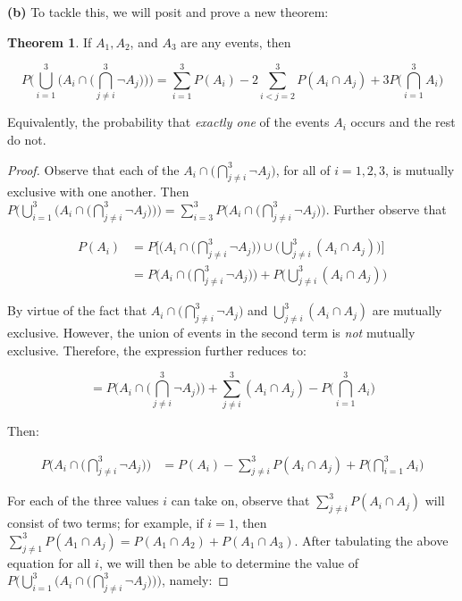 \documentclass[10pt, oneside]{article}   	%
\theoremstyle{definition}
\newtheorem*{thm}{Theorem}
\begin{document}
\begin{enumerate}[label=3.\arabic*]
\textbf{(b)} To tackle this, we will posit and prove a new theorem:

\begin{thm}If $A_1, A_2$, and $A_3$ are any events, then

\[ P \Bigg( \bigcup^3_{i=1} \bigg( A_i  \cap \Big( \bigcap^3_{j \neq i} \neg A_j \Big) \bigg) \Bigg) = \sum^3_{i = 1} P(A_i) - 2 \sum^3_{i < j = 2} P(A_i \cap A_j) + 3 P\Bigg( \bigcap^3_{i=1} A_i \Bigg) \]

Equivalently, the probability that \textit{exactly one} of the events $A_i$ occurs and the rest do not.
\end{thm}

\begin{proof}Observe that each of the $A_i  \cap \Big( \bigcap^3_{j \neq i} \neg A_j \Big)$, for all of $i = 1, 2, 3$, is mutually exclusive with one another. Then $P \Bigg( \bigcup^3_{i=1} \bigg( A_i  \cap \Big( \bigcap^3_{j \neq i} \neg A_j \Big) \bigg) \Bigg) = \sum^3_{i = 3} P \Bigg( A_i  \cap \Big( \bigcap^3_{j \neq i} \neg A_j \Big) \Bigg)$. Further observe that

\begin{align*}
P(A_i) &= P\Bigg[ \Bigg( A_i  \cap \Big( \bigcap^3_{j \neq i} \neg A_j \Big) \Bigg) \cup \Bigg( \bigcup^3_{j \neq i} (A_i \cap A_j) \Bigg) \Bigg] \\
&= P\Bigg( A_i  \cap \Big( \bigcap^3_{j \neq i} \neg A_j \Big) \Bigg) + P \Bigg( \bigcup^3_{j \neq i} (A_i \cap A_j) \Bigg) 
\end{align*}

By virtue of the fact that $A_i  \cap \Big( \bigcap^3_{j \neq i} \neg A_j \Big)$ and $\bigcup^3_{j \neq i} (A_i \cap A_j)$ are mutually exclusive. However, the union of events in the second term is \textit{not} mutually exclusive. Therefore, the expression further reduces to:

\[ = P\Bigg( A_i  \cap \Big( \bigcap^3_{j \neq i} \neg A_j \Big) \Bigg) + \sum^3_{j \neq i} (A_i \cap A_j) - P\Bigg( \bigcap^3_{i = 1} A_i \Bigg) \]

Then:

\begin{align*}
P \Bigg( A_i  \cap \Big( \bigcap^3_{j \neq i} \neg A_j \Big) \Bigg) &= P(A_i) - \sum^3_{j \neq i} P(A_i \cap A_j) + P \Bigg( \bigcap^3_{i=1} A_i \Bigg)
\end{align*}

For each of the three values $i$ can take on, observe that $\sum^3_{j \neq i} P(A_i \cap A_j)$ will consist of two terms; for example, if $i = 1$, then $\sum^3_{j \neq 1} P(A_1 \cap A_j) = P(A_1 \cap A_2) + P(A_1 \cap A_3)$. After tabulating the above equation for all $i$, we will then be able to determine the value of $P \Bigg( \bigcup^3_{i=1} \bigg( A_i  \cap \Big( \bigcap^3_{j \neq i} \neg A_j \Big) \bigg) \Bigg) $, namely:


\end{proof}
\end{enumerate}
\end{document}
